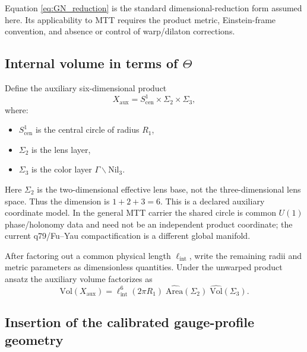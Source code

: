 \documentclass[11pt]{article}
\begin{document}
Equation \eqref{eq:GN_reduction} is the standard dimensional-reduction
form assumed here. Its applicability to MTT requires the product metric,
Einstein-frame convention, and absence or control of warp/dilaton corrections.

\subsection{Internal volume in terms of $\Theta$}

Define the auxiliary six-dimensional product
\begin{equation}
X_{\mathrm{aux}}
=
S^1_{\mathrm{cen}} \times \Sigma_2 \times \Sigma_3,
\end{equation}
where:
\begin{itemize}
\item $S^1_{\mathrm{cen}}$ is the central circle of radius $R_1$,
\item $\Sigma_2$ is the lens layer,
\item $\Sigma_3$ is the color layer $\Gamma\backslash\mathrm{Nil}_3$.
\end{itemize}

Here $\Sigma_2$ is the two-dimensional effective lens base, not the
three-dimensional lens space. Thus the dimension is $1+2+3=6$. This is a
declared auxiliary coordinate model. In the general MTT carrier the shared
circle is common $U(1)$ phase/holonomy data and need not be an independent
product coordinate; the current q79/Fu--Yau compactification is a different
global manifold.

After factoring out a common physical length $\ell_{\mathrm{int}}$,
write the remaining radii and metric parameters as dimensionless quantities.
Under the unwarped product ansatz the auxiliary volume factorizes as
\begin{equation}
\mathrm{Vol}(X_{\mathrm{aux}})
=
\ell_{\mathrm{int}}^6(2\pi R_1)\;
\widehat{\mathrm{Area}}(\Sigma_2)\;
\widehat{\mathrm{Vol}}(\Sigma_3).
\label{eq:internal_volume_factorized}
\end{equation}

\subsection{Insertion of the calibrated gauge-profile geometry}
\end{document}

